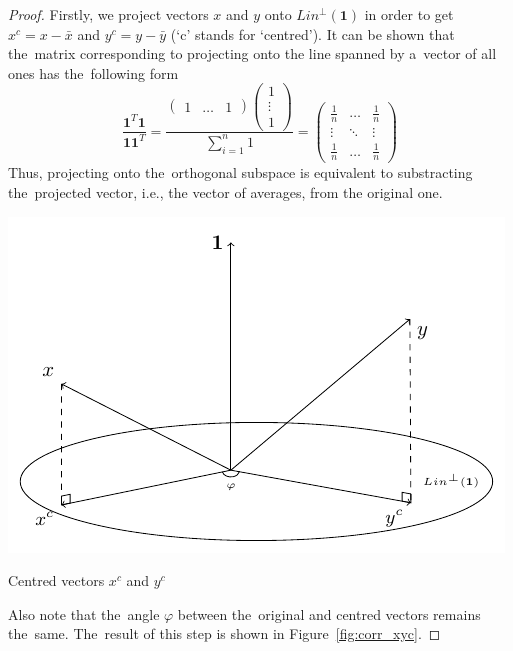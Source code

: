 \begin{proof}
Firstly, we project vectors $x$ and $y$ onto $Lin^{\perp}(\mathbf{1})$
in order to get $x^c = x - \bar x$ and $y^c = y - \bar y$ (`c' stands for `centred').
It can be shown that the~matrix corresponding to projecting onto the line spanned by
a~vector of all ones has the~following form
\[
\frac{\mathbf{1}^T \mathbf{1}}{\mathbf{1} \mathbf{1}^T} = \frac{\begin{pmatrix} 1 & \ldots & 1 \end{pmatrix} \begin{pmatrix} 1 \\ \vdots \\ 1 \end{pmatrix}}{\sum_{i=1}^n 1} = \begin{pmatrix} \frac{1}{n} & \ldots & \frac{1}{n} \\ \vdots & \ddots & \vdots \\ \frac{1}{n} & \ldots & \frac{1}{n} \end{pmatrix}
\]
Thus, projecting onto the~orthogonal subspace is equivalent to
substracting the~projected vector, i.e., the vector of averages, from the original one.

\begin{marginfigure}
\includegraphics[scale=0.65]{figures/02_correlation_constant_centered_variables.pdf}
\caption{Centred vectors $x^c$ and $y^c$}
\label{fig:corr_xyc}
\end{marginfigure}

Also note that the~angle $\varphi$ between the~original and centred vectors remains the~same.
The~result of this step is shown in Figure~\ref{fig:corr_xyc}.


\end{proof}
